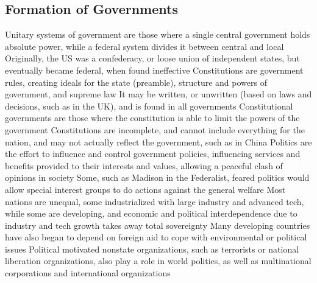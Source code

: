 \documentclass[11 pt, twoside]{article}
\newenvironment{outline*}
{
	\begin{outline}[enumerate]
	}
	{\end{outline}
}
\begin{document}
\subsection{Formation of Governments}
\begin{outline*}
\1 Unitary systems of government are those where a single central government holds absolute power, while a federal system divides it between central and local
\2 Originally, the US was a confederacy, or loose union of independent states, but eventually became federal, when found ineffective
\1 Constitutions are government rules, creating ideals for the state (preamble), structure and powers of government, and supreme law
\2 It may be written, or unwritten (based on laws and decisions, such as in the UK), and is found in all governments
\2 Constitutional governments are those where the constitution is able to limit the powers of the government
\2 Constitutions are incomplete, and cannot include everything for the nation, and may not actually reflect the government, such as in China
\1 Politics are the effort to influence and control government policies, influencing services and benefits provided to their interests and values, allowing a peaceful clash of opinions in society
\2 Some, such as Madison in the Federalist, feared politics would allow special interest groups to do actions against the general welfare
\1 Most nations are unequal, some industrialized with large industry and advanced tech, while some are developing, and economic and political interdependence due to industry and tech growth takes away total sovereignty
\2 Many developing countries have also began to depend on foreign aid to cope with environmental or political issues
\2 Political motivated nonstate organizations, such as terrorists or national liberation organizations, also play a role in world politics, as well as multinational corporations and international organizations
\end{outline*}
\end{document}
